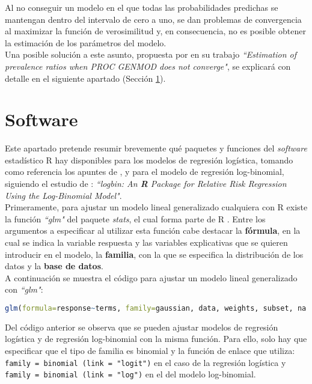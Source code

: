Al no conseguir un modelo en el que todas las probabilidades predichas se mantengan dentro del intervalo de cero a uno, se dan problemas de convergencia al maximizar la función de verosimilitud y, en consecuencia, no es posible obtener la estimación de los parámetros del modelo. \\

Una posible solución a este asunto, propuesta por \textcite{COPY} en su trabajo \textit{``Estimation of prevalence ratios when PROC GENMOD does not converge"}, se explicará con detalle en el siguiente apartado (Sección \ref{cap:software}).

\section{Software}\label{cap:software}
Este apartado pretende resumir brevemente qué paquetes y funciones del \textit{software} estadístico R hay disponibles para los modelos de regresión logística, tomando como referencia los apuntes de \textcite{Mlgz}, y para el modelo de regresión log-binomial, siguiendo el estudio de \textcite{logbinom2}: \textit{``logbin: An \textbf{R} Package for Relative Risk Regression Using the Log-Binomial Model"}.\\

Primeramente, para ajustar un modelo lineal generalizado cualquiera con R existe la función \textit{``glm"} del paquete \textit{stats}, el cual forma parte de R \autocite{R}. Entre los argumentos a especificar al utilizar esta función cabe destacar la \textbf{fórmula}, en la cual se indica la variable respuesta y las variables explicativas que se quieren introducir en el modelo, la \textbf{familia}, con la que se especifica la distribución de los datos y la \textbf{base de datos}. \\

A continuación se muestra el código para ajustar un modelo lineal generalizado con \textit{``glm"}:

\begin{lstlisting}[language=R, caption=Uso de la función glm \{stats\} en R.]
 glm(formula=response~terms, family=gaussian, data, weights, subset, na.action, start=NULL, etastart, mustart, offset, control=list(...), model=TRUE, method="glm.fit", x=FALSE, y = TRUE, singular.ok=TRUE, contrasts=NULL,...)
\end{lstlisting}

Del código anterior se observa que se pueden ajustar modelos de regresión logística y de regresión log-binomial con la misma función. Para ello, solo hay que especificar que el tipo de familia es binomial y la función de enlace que utiliza: \lstinline{family = binomial (link = "logit")} en el caso de la regresión logística y \lstinline{family = binomial (link = "log")} en el del modelo log-binomial.\\

